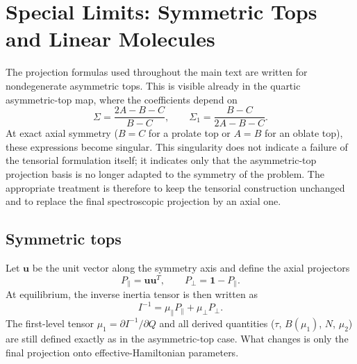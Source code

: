 \documentclass[journal=jacsat,manuscript=article]{achemso}
\begin{document}
\section{Special Limits: Symmetric Tops and Linear Molecules}
\label{sec:appendix_special_limits}

The projection formulas used throughout the main text are written for
nondegenerate asymmetric tops. This is visible already in the quartic
asymmetric-top map, where the coefficients depend on
\begin{equation}
\Sigma = \frac{2A-B-C}{B-C},
\qquad
\Sigma_1 = \frac{B-C}{2A-B-C}.
\end{equation}
At exact axial symmetry ($B=C$ for a prolate top or $A=B$ for an oblate top),
these expressions become singular. This singularity does not indicate a failure
of the tensorial formulation itself; it indicates only that the asymmetric-top
projection basis is no longer adapted to the symmetry of the problem. The
appropriate treatment is therefore to keep the tensorial construction unchanged
and to replace the final spectroscopic projection by an axial one.

\subsection{Symmetric tops}

Let $\mathbf u$ be the unit vector along the symmetry axis and define the axial
projectors
\begin{equation}
P_{\parallel} = \mathbf u\mathbf u^T,
\qquad
P_{\perp} = \mathbf 1 - P_{\parallel}.
\end{equation}
At equilibrium, the inverse inertia tensor is then written as
\begin{equation}
I^{-1} = \mu_{\parallel} P_{\parallel} + \mu_{\perp} P_{\perp}.
\end{equation}
The first-level tensor $\mu_1=\partial I^{-1}/\partial Q$ and all derived
quantities ($\tau$, $B(\mu_1)$, $N$, $\mu_2$) are still defined exactly as in
the asymmetric-top case. What changes is only the final projection onto
effective-Hamiltonian parameters.
\end{document}
